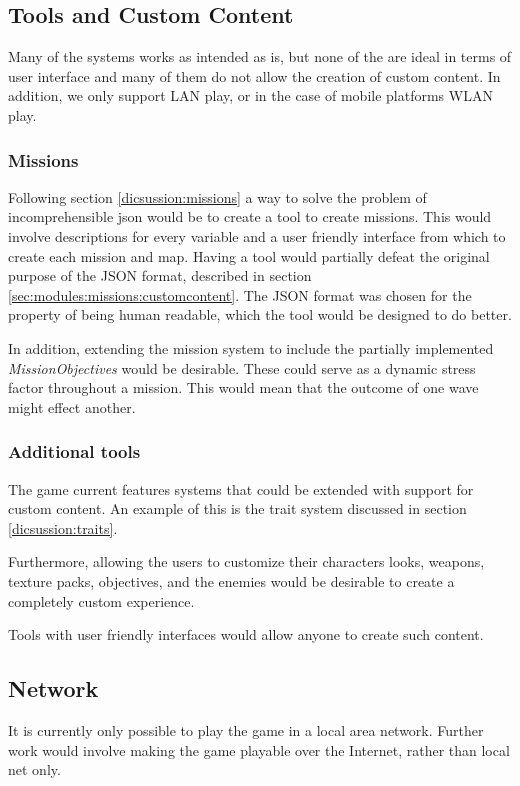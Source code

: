 \subsection{Tools and Custom Content}
Many of the systems works as intended as is, but none of the are ideal in terms of user interface and many of them do not allow the creation of custom content.
In addition, we only support LAN play, or in the case of mobile platforms WLAN play.

\subsubsection{Missions}
Following section \ref{dicsussion:missions} a way to solve the problem of incomprehensible json would be to create a tool to create missions.
This would involve descriptions for every variable and a user friendly interface from which to create each mission and map.
Having a tool would partially defeat the original purpose of the JSON format, described in section \ref{sec:modules:missions:customcontent}.
The JSON format was chosen for the property of being human readable, which the tool would be designed to do better.

In addition, extending the mission system to include the partially implemented \textit{MissionObjectives} would be desirable.
These could serve as a dynamic stress factor throughout a mission.
This would mean that the outcome of one wave might effect another.

\subsubsection{Additional tools}
The game current features systems that could be extended with support for custom content.
An example of this is the trait system discussed in section \ref{dicsussion:traits}.

Furthermore, allowing the users to customize their characters looks, weapons, texture packs, objectives, and the enemies would be desirable to create a completely custom experience.

Tools with user friendly interfaces would allow anyone to create such content.

\subsection{Network}

It is currently only possible to play the game in a local area network.
Further work would involve making the game playable over the Internet, rather than local net only.

